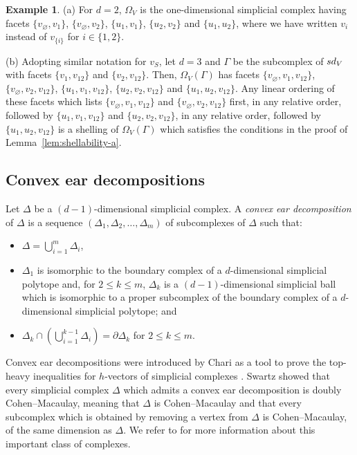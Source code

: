 \documentclass[11pt]{amsart}
\theoremstyle{theorems}
\theoremstyle{definition}
\newtheorem{example}[theorem]{Example}
\newcommand{\sd}{{\rm sd}}
\begin{document}
\begin{example} 
(a) For $d=2$, $\Omega_V$ is the one-dimensional simplicial 
complex having facets $\{v_\varnothing, v_1\}$, 
$\{v_\varnothing, v_2\}$, $\{u_1, v_1\}$, $\{u_2, v_2\}$ 
and $\{u_1, u_2\}$, where we have written $v_i$ instead of 
$v_{\{i\}}$ for $i \in \{1, 2\}$.

(b) Adopting similar notation for $v_S$, let $d=3$ and 
$\Gamma$ be the subcomplex of $\sd_V$ with facets $\{v_1, 
v_{12}\}$ and $\{v_2, v_{12}\}$. Then, $\Omega_V(\Gamma)$
has facets $\{v_\varnothing, v_1, v_{12}\}$, 
$\{v_\varnothing, v_2, v_{12}\}$, $\{u_1, v_1, v_{12}\}$, 
$\{u_2, v_2, v_{12}\}$ and $\{u_1, u_2, v_{12}\}$. Any 
linear ordering of these facets which lists $\{v_\varnothing, 
v_1, v_{12}\}$ and $\{v_\varnothing, v_2, v_{12}\}$ first, 
in any relative order, followed by $\{u_1, v_1, v_{12}\}$ 
and $\{u_2, v_2, v_{12}\}$, in any relative order, followed
by $\{u_1, u_2, v_{12}\}$ is a shelling of 
$\Omega_V(\Gamma)$ which satisfies the conditions in the 
proof of Lemma~\ref{lem:shellability-a}.
\end{example}

\subsection{Convex ear decompositions} 
\label{sec:ced}

Let $\Delta$ be a $(d-1)$-dimensional simplicial complex. 
A \emph{convex ear decomposition} of $\Delta$ is a sequence 
$(\Delta_1, \Delta_2,\dots,\Delta_m)$ of subcomplexes of 
$\Delta$ such that:
%
\begin{itemize}
\item[{\rm (i)}] 
$\Delta = \bigcup_{i=1}^m \Delta_i$,
    
\item[{\rm (ii)}] 
$\Delta_1$ is isomorphic to the boundary complex of a 
$d$-dimensional simplicial polytope and, for $2 \le k \le m$, 
$\Delta_k$ is a $(d-1)$-dimensional simplicial ball which is
isomorphic to a proper subcomplex of the boundary complex of 
a $d$-dimensional simplicial polytope; and
	
\item[{\rm (iii)}]
$\Delta_k \cap \left( \bigcup_{i=1}^{k-1} \Delta_i \right) = 
 \partial \Delta_k$ for $2 \le k \le m$.
%
\end{itemize}

Convex ear decompositions were introduced by Chari \cite{Ch97} 
as a tool to prove the top-heavy inequalities for $h$-vectors 
of simplicial complexes \cite[Corollary~2]{Ch97}. Swartz 
\cite[Theorem~4.1]{Sw06} showed that every simplicial complex 
$\Delta$ which admits a convex ear decomposition is doubly 
Cohen--Macaulay, meaning that $\Delta$ is Cohen--Macaulay and 
that every subcomplex which is obtained by removing a vertex 
from $\Delta$ is Cohen--Macaulay, of the same dimension as 
$\Delta$. We refer to \cite[Section~III.3]{Sta96} for more 
information about this important class of complexes. 
\end{document}
